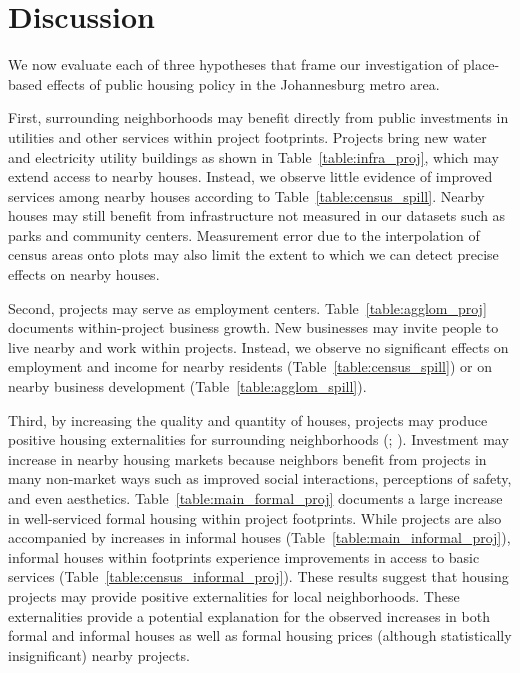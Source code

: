 \documentclass[12pt]{article}
\newcommand{\rv}{}
\begin{document}
\section{Discussion}\label{section:discussion}


\rv{We now evaluate each of three hypotheses that frame our investigation of place-based effects of public housing policy in the Johannesburg metro area.}

\rv{First, surrounding neighborhoods may benefit directly from public investments in utilities and other services within project footprints.  Projects bring new water and electricity utility buildings as shown in Table~\ref{table:infra_proj}, which may extend access to nearby houses.  Instead, we observe little evidence of improved services among nearby houses according to Table~\ref{table:census_spill}.  Nearby houses may still benefit from infrastructure not measured in our datasets such as parks and community centers.  Measurement error due to the interpolation of census areas onto plots may also limit the extent to which we can detect precise effects on nearby houses.}

\rv{Second, projects may serve as employment centers.  Table~\ref{table:agglom_proj} documents within-project business growth.  New businesses may invite people to live nearby and work within projects.  Instead, we observe no significant effects on employment and income for nearby residents (Table~\ref{table:census_spill}) or on nearby business development (Table~\ref{table:agglom_spill}).  }

\rv{Third, by increasing the quality and quantity of houses, projects may produce positive housing externalities for surrounding neighborhoods (\cite{rossi2010housing}; \cite{diamond2019wants}).  Investment may increase in nearby housing markets because neighbors benefit from projects in many non-market ways such as improved social interactions, perceptions of safety, and even aesthetics.  Table~\ref{table:main_formal_proj} documents a large increase in well-serviced formal housing within project footprints.  While projects are also accompanied by increases in informal houses (Table~\ref{table:main_informal_proj}), informal houses within footprints experience improvements in access to basic services (Table~\ref{table:census_informal_proj}).  These results suggest that housing projects may provide positive externalities for local neighborhoods.  These externalities provide a potential explanation for the observed increases in both formal and informal houses as well as formal housing prices (although statistically insignificant) nearby projects.}
\end{document}
